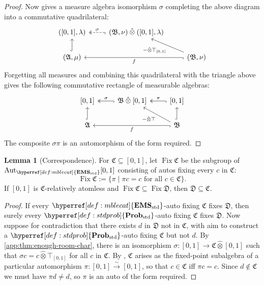 \documentclass[
  sigconf,
  screen, ]{acmart}
\theoremstyle{definition}
\newtheorem{lemma}[theorem]{Lemma}
\newcommand\Aut{\operatorname{Aut}}
\newcommand\frakA{\mathfrak A}
\newcommand\frakB{\mathfrak B}
\newcommand\frakC{\mathfrak C}
\newcommand\frakD{\mathfrak D}
\newcommand\fremlin[1]{\citet[#1]{fremlin2000measure}}
\newcommand\nref[2]{\hyperref[#1]{#2}} \newcommand\checkhigh{{\huge{\color{red}\textbf{TODO: check}}}}
\newcommand\lmafp{\mathbin{\hat\otimes}}
\newcommand\texStdProb{\mathbf{Prob}_{\rm std}}
\newcommand\StdProb{{\nref{def:stdprob}{\texStdProb}}}
\newcommand\texStdMble{\mathbf{EMS}_{\rm std}}
\newcommand\StdMble{{\nref{def:mblecat}{\texStdMble}}}
\newcommand\Fix{\operatorname{Fix}}
\begin{document}
\begin{proof}
  Now \fremlin{\href{https://www1.essex.ac.uk/maths/people/fremlin/chap33.pdf\#page=22}{333C(b)}}
  gives a measure algebra isomorphism
  $\sigma$ completing
  the above diagram into a commutative quadrilateral:
  \[
\begin{tikzcd}
  {([0,1],\lambda)}              & {(\frakB,\nu)\lmafp([0,1],\lambda)} \arrow[l, "\sigma"', two heads, hook, dashed] &                                                                           \\
  {(\frakA,\mu)} \arrow[u, hook] &                                                           & {(\frakB,\nu)} \arrow[ll, "f", hook] \arrow[lu, "{-\lmafp \top_{[0,1]}}"]
  \end{tikzcd}
  \]
  Forgetting all measures and
  combining this quadrilateral with the triangle above gives the following commutative rectangle
  of measurable algebras:
  \[\begin{tikzcd}
  {[0,1]}              & {\frakB\lmafp[0,1]} \arrow[l, "\sigma"', two heads, hook] & {[0,1]} \arrow[l, "\pi"', two heads, hook]                                                        \\
  {\frakA} \arrow[u, hook] &                                          & {\frakB} \arrow[ll, "f", hook] \arrow[u, hook] \arrow[lu, "{-\lmafp \top}"]
  \end{tikzcd}\]
  The composite $\sigma\pi$ is an automorphism of the form required.
\end{proof}

\begin{lemma}[Correspondence] \label{app:lem:mble-distinguishability}
  For $\frakC\subseteq[0,1]$, let $\Fix\frakC$ be the subgroup of $\Aut_{\StdMble}[0,1]$
  consisting of autos fixing every $c$ in $\frakC$:
  \[ \Fix\frakC := \{ \pi \mid \pi c =c\text{ for all }c \in \frakC \}. \]
  If $[0,1]$ is $\frakC$-relatively atomless
  and $\Fix\frakC\subseteq\Fix\frakD$,
  then $\frakD\subseteq\frakC$.
\end{lemma}
\begin{proof}
  If every $\StdMble$-auto fixing $\frakC$ fixes $\frakD$,
  then surely every $\StdProb$-auto fixing $\frakC$
  fixes $\frakD$.
  Now suppose for contradiction that there exists $d$ in $\frakD$ not in $\frakC$,
  with aim to construct a $\StdProb$-auto fixing $\frakC$ but not $d$.
  By \cref{app:thm:enough-room-char},
  there is an isomorphism $\sigma : [0,1]\to \frakC\lmafp[0,1]$
  such that $\sigma c = c\lmafp \top_{[0,1]}$ for all $c$ in $\frakC$.
  By \fremlin{\href{https://www1.essex.ac.uk/maths/people/fremlin/chap33.pdf\#page=35}{333R(ii)$\Rightarrow$(iii)}},
  $\frakC$ arises as the fixed-point subalgebra of a particular automorphism
   $\pi : [0,1]\xrightarrow\sim[0,1]$,
   so that $c\in\frakC$ iff $\pi c = c$.
  Since $d\notin\frakC$ we must have $\pi d \ne d$,
  so $\pi$ is an auto of the form required.
\end{proof}
\end{document}
